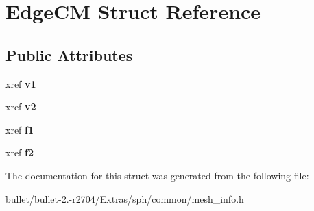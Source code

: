 \hypertarget{struct_edge_c_m}{\section{Edge\+C\+M Struct Reference}
\label{struct_edge_c_m}
}
\subsection*{Public Attributes}
\begin{DoxyCompactItemize}
\item 
\hypertarget{struct_edge_c_m_a067f6282959ca694f9f129d7a17dc920}{xref {\bfseries v1}}\label{struct_edge_c_m_a067f6282959ca694f9f129d7a17dc920}

\item 
\hypertarget{struct_edge_c_m_ae23a6f36b5d1a0b2896591a9dad55afe}{xref {\bfseries v2}}\label{struct_edge_c_m_ae23a6f36b5d1a0b2896591a9dad55afe}

\item 
\hypertarget{struct_edge_c_m_aca63a0f2640cabde5b40c8e2100d4d6c}{xref {\bfseries f1}}\label{struct_edge_c_m_aca63a0f2640cabde5b40c8e2100d4d6c}

\item 
\hypertarget{struct_edge_c_m_a8e4e63c58d7f241fb32177d5679693ef}{xref {\bfseries f2}}\label{struct_edge_c_m_a8e4e63c58d7f241fb32177d5679693ef}

\end{DoxyCompactItemize}


The documentation for this struct was generated from the following file\+:\begin{DoxyCompactItemize}
\item 
bullet/bullet-\/2.-\/r2704/\+Extras/sph/common/mesh\+\_\+info.\+h\end{DoxyCompactItemize}
